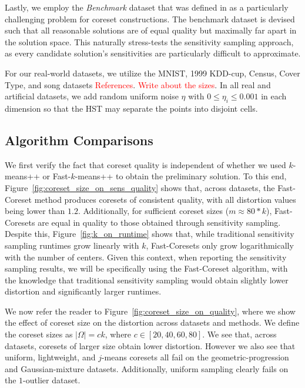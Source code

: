 Lastly, we employ the \emph{Benchmark} dataset that was defined in \cite{chrisESA} as a particularly challenging problem for coreset constructions.  The
benchmark dataset is devised such that all reasonable solutions are of equal quality but maximally far apart in the solution space. This naturally stress-tests
the sensitivity sampling approach, as every candidate solution's sensitivities are particularly difficult to approximate.

For our real-world datasets, we utilize the MNIST, 1999 KDD-cup, Census, Cover Type, and song datasets \textcolor{red}{References}. \textcolor{red}{Write about the sizes}. In all real and
artificial datasets, we add random uniform noise $\eta$ with $0 \leq \eta_i \leq 0.001$ in each dimension so that the HST may separate the points into disjoint
cells.

\subsection{Algorithm Comparisons}
\label{ssec:alg_qualities}

We first verify the fact that coreset quality is independent of whether we used $k$-means++ or Fast-$k$-means++ to obtain the preliminary solution. To this end,
Figure~\ref{fig:coreset_size_on_sens_quality} shows that, across datasets, the Fast-Coreset method produces coresets of consistent quality, with all distortion
values being lower than $1.2$. Additionally, for sufficient coreset sizes ($m \approx 80 * k$), Fast-Coresets are equal in quality to those obtained through
sensitivity sampling. Despite this, Figure~\ref{fig:k_on_runtime} shows that, while traditional sensitivity sampling runtimes grow linearly with $k$,
Fast-Coresets only grow logarithmically with the number of centers. Given this context, when reporting the sensitivity sampling results, we will be
specifically using the Fast-Coreset algorithm, with the knowledge that traditional sensitivity sampling would obtain slightly lower distortion and significantly
larger runtimes.

We now refer the reader to Figure~\ref{fig:coreset_size_on_quality}, where we show the effect of coreset size on the distortion across datasets and methods.
We define the coreset sizes as $|\Omega| = ck$, where $c \in [20, 40, 60, 80]$. We see that, across datasets, coresets of larger size obtain lower distortion. However
we also see that uniform, lightweight, and $j$-means coresets all fail on the geometric-progression and Gaussian-mixture datasets. Additionally, uniform
sampling clearly fails on the $1$-outlier dataset.




